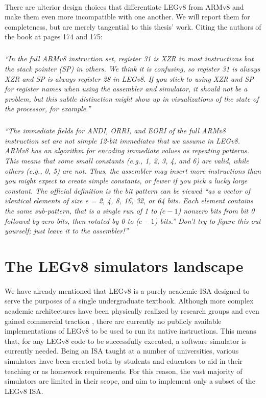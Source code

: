 \paragraph{}
There are ulterior design choices that differentiate LEGv8 from ARMv8 and make them even more incompatible with one another.  We will report them for completeness, but are merely tangential to this thesis' work. Citing the authors of the book \cite{patterson2016computer} at pages 174 and 175:
\subparagraph{}
\emph{
``In the full ARMv8 instruction set, register 31 is XZR in most instructions
but the stack pointer (SP) in others. We think it is confusing, so register 31 is
always XZR and SP is always register 28 in LEGv8. If you stick to using XZR
and SP for register names when using the assembler and simulator, it should
not be a problem, but this subtle distinction might show up in visualizations
of the state of the processor, for example.''}
\subparagraph{}
\emph{
``The immediate fields for ANDI, ORRI, and EORI of the full ARMv8
instruction set are not simple 12-bit immediates that we assume in LEGv8.
ARMv8 has an algorithm for encoding immediate values as repeating
patterns. This means that some small constants (e.g., 1, 2, 3, 4, and 6) are
valid, while others (e.g., 0, 5) are not. Thus, the assembler may insert more
instructions than you might expect to create simple constants, or fewer if
you pick a lucky large constant. The official definition is the bit pattern can
be viewed “as a vector of identical elements of size e = 2, 4, 8, 16, 32, or 64
bits. Each element contains the same sub-pattern, that is a single run of 1
to ($e - 1$) nonzero bits from bit 0 followed by zero bits, then rotated by 0 to
($e - 1$) bits.” Don’t try to figure this out yourself; just leave it to the assembler!''}

\section{The LEGv8 simulators landscape}

\paragraph{}
We have already mentioned that LEGv8 is a purely academic ISA designed to serve the purposes of a single undergraduate textbook. Although more complex academic architectures have been physically realized by research groups and even gained commercial traction \cite{riscvweb}, there are currently no publicly available implementations of LEGv8 to be used to run its native instructions. This means that, for any LEGv8 code to be successfully executed, a software simulator is currently needed. Being an ISA taught at a number of universities, various simulators have been created both by students and educators to aid in their teaching or as homework requirements. For this reason, the vast majority of simulators are limited in their scope, and aim to implement only a subset of the LEGv8 ISA.

